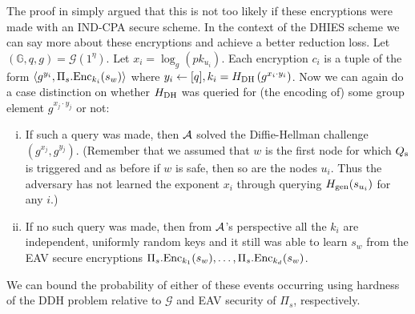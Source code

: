 The proof in \cite{ttkem} simply argued that this is not too likely if these encryptions were made with an IND-CPA secure scheme. In the context of the DHIES scheme we can say more about these encryptions and achieve a better reduction loss.
Let $(\mathbb{G}, q, g) = \mathcal{G}(1^\eta)$.
Let $x_i = \log_g(pk_{u_i})$. Each encryption $c_i$ is a tuple of the form $\langle g^{y_i}, \Pi_s.\mathrm{Enc}_{k_i}(s_w) \rangle$ where $y_i \leftarrow [q], k_i = H_\mathrm{DH}\left(g^{x_i \cdot y_i}\right)$. Now we can again do a case distinction on whether $H_\mathrm{DH}$ was queried for (the encoding of) some group element $g^{x_j \cdot y_j}$ or not:
\begin{enumerate}[(i)]
	\item \label{qs-triggered-case-1} If such a query was made, then $\mathcal{A}$ solved the Diffie-Hellman challenge $(g^{x_j}, g^{y_j})$. (Remember that we assumed that $w$ is the first node for which $Q_\mathrm{s}$ is triggered and as before if $w$ is safe, then so are the nodes $u_i$. Thus the adversary has not learned the exponent $x_i$ through querying $H_\mathrm{gen}(s_{u_i})$ for any $i$.)
	\item \label{qs-triggered-case-2} If no such query was made, then from $\mathcal{A}$'s perspective all the $k_i$ are independent, uniformly random keys and it still was able to learn $s_w$ from the EAV secure encryptions $\Pi_s.\mathrm{Enc}_{k_1}(s_w), \ldots, \Pi_s.\mathrm{Enc}_{k_d}(s_w)$.
\end{enumerate}
We can bound the probability of either of these events occurring using hardness of the DDH problem relative to $\mathcal{G}$ and EAV security of $\Pi_s$, respectively.

